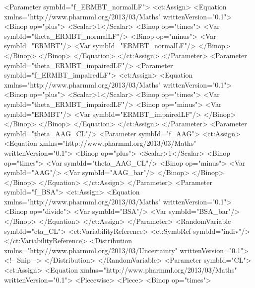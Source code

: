 \documentclass[a4paper,11pt]{article}
\begin{document}
\begin{xmlcode}
<Parameter symbId="f_ERMBT_normalLF">
    <ct:Assign>
        <Equation xmlns="http://www.pharmml.org/2013/03/Maths" writtenVersion="0.1">
            <Binop op="plus">
                <Scalar>1</Scalar>
                <Binop op="times">
                    <Var symbId="theta_ERMBT_normalLF"/>
                    <Binop op="minus">
                        <Var symbId="ERMBT"/>
                        <Var symbId="ERMBT_normalLF"/>
                    </Binop>
                </Binop>
            </Binop>
        </Equation>
    </ct:Assign>
</Parameter>
<Parameter symbId="theta_ERMBT_impairedLF"/>
<Parameter symbId="f_ERMBT_impairedLF">
    <ct:Assign>
        <Equation xmlns="http://www.pharmml.org/2013/03/Maths" writtenVersion="0.1">
            <Binop op="plus">
                <Scalar>1</Scalar>
                <Binop op="times">
                    <Var symbId="theta_ERMBT_impairedLF"/>
                    <Binop op="minus">
                        <Var symbId="ERMBT"/>
                        <Var symbId="ERMBT_impairedLF"/>
                    </Binop>
                </Binop>
            </Binop>
        </Equation>
    </ct:Assign>
</Parameter>
<Parameter symbId="theta_AAG_CL"/>
<Parameter symbId="f_AAG">
    <ct:Assign>
        <Equation xmlns="http://www.pharmml.org/2013/03/Maths" writtenVersion="0.1">
            <Binop op="plus">
                <Scalar>1</Scalar>
                <Binop op="times">
                    <Var symbId="theta_AAG_CL"/>
                    <Binop op="minus">
                        <Var symbId="AAG"/>
                        <Var symbId="AAG_bar"/>
                    </Binop>
                </Binop>
            </Binop>
        </Equation>
    </ct:Assign>
</Parameter>
<Parameter symbId="f_BSA">
    <ct:Assign>
        <Equation xmlns="http://www.pharmml.org/2013/03/Maths" writtenVersion="0.1">
            <Binop op="divide">
                <Var symbId="BSA"/>
                <Var symbId="BSA_bar"/>
            </Binop>
        </Equation>
    </ct:Assign>
</Parameter>
<RandomVariable symbId="eta_CL">
    <ct:VariabilityReference>
        <ct:SymbRef symbId="indiv"/>
    </ct:VariabilityReference>
    <Distribution xmlns="http://www.pharmml.org/2013/03/Uncertainty"
    writtenVersion="0.1">
         <!-- Snip -->
    </Distribution>
</RandomVariable>
<Parameter symbId="CL">
    <ct:Assign>
        <Equation xmlns="http://www.pharmml.org/2013/03/Maths" writtenVersion="0.1">
            <Piecewise>
                <Piece>
                    <Binop op="times">

\end{xmlcode}
\end{document}

